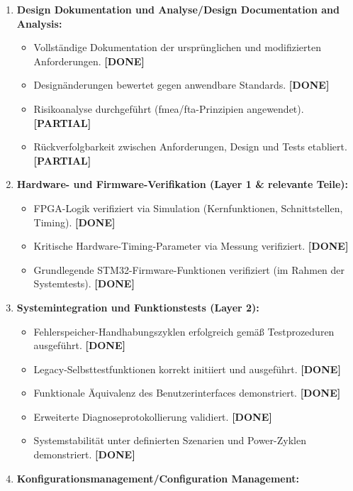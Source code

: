 \begin{enumerate}
	\item \textbf{Design Dokumentation und Analyse/Design Documentation and Analysis:}
	      \begin{itemize}
		      \item Vollständige Dokumentation der ursprünglichen und modifizierten Anforderungen. \textbf{[DONE]}
		      \item Designänderungen bewertet gegen anwendbare Standards. \textbf{[DONE]}
		      \item Risikoanalyse durchgeführt (\gls{fmea}/\gls{fta}-Prinzipien angewendet). \textbf{[PARTIAL]}
		      \item Rückverfolgbarkeit zwischen Anforderungen, Design und Tests etabliert. \textbf{[PARTIAL]}
	      \end{itemize}
	\item \textbf{Hardware- und Firmware-Verifikation (Layer 1 \& relevante Teile):}
	      \begin{itemize}
		      \item FPGA-Logik verifiziert via Simulation (Kernfunktionen, Schnittstellen, Timing). \textbf{[DONE]}
		      \item Kritische Hardware-Timing-Parameter via Messung verifiziert. \textbf{[DONE]}
		      \item Grundlegende STM32-Firmware-Funktionen verifiziert (im Rahmen der Systemtests). \textbf{[DONE]}
	      \end{itemize}
	\item \textbf{Systemintegration und Funktionstests (Layer 2):}
	      \begin{itemize}
		      \item Fehlerspeicher-Handhabungszyklen erfolgreich gemäß Testprozeduren ausgeführt. \textbf{[DONE]}
		      \item Legacy-Selbsttestfunktionen korrekt initiiert und ausgeführt. \textbf{[DONE]}
		      \item Funktionale Äquivalenz des Benutzerinterfaces demonstriert. \textbf{[DONE]}
		      \item Erweiterte Diagnoseprotokollierung validiert. \textbf{[DONE]}
		      \item Systemstabilität unter definierten Szenarien und Power-Zyklen demonstriert. \textbf{[DONE]}
	      \end{itemize}
	\item \textbf{Konfigurationsmanagement/Configuration Management:}
	      \begin{itemize}

\end{itemize}
\end{enumerate}
